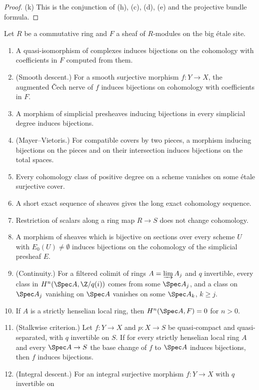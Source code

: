 \begin{proof}
(k) This is the conjunction of (h), (c), (d), (e) and the projective bundle formula.
\end{proof}

\begin{proposition}\label{prop:pf:steps2:etbasic}
Let $R$ be a commutative ring and $F$ a sheaf of $R$-modules on the big \'etale site.
\begin{enumerate}[label=\textup{(\alph*)},leftmargin=2.2em]
\item A quasi-isomorphism of complexes induces bijections on the cohomology with coefficients in
  $F$ computed from them.
\item (Smooth descent.) For a smooth surjective morphism $f\colon Y\to X$, the augmented \v{C}ech nerve
  of $f$ induces bijections on cohomology with coefficients in $F$.
\item A morphism of simplicial presheaves inducing bijections in every simplicial degree induces
  bijections.
\item (Mayer--Vietoris.) For compatible covers by two pieces, a morphism inducing bijections on the
  pieces and on their intersection induces bijections on the total spaces.
\item Every cohomology class of positive degree on a scheme vanishes on some \'etale surjective
  cover.
\item A short exact sequence of sheaves gives the long exact cohomology sequence.
\item Restriction of scalars along a ring map $R\to S$ does not change cohomology.
\item A morphism of sheaves which is bijective on sections over every scheme $U$ with
  $E_0(U)\ne\emptyset$ induces bijections on the cohomology of the simplicial presheaf $E$.
\item (Continuity.) For a filtered colimit of rings $A=\varinjlim A_j$ and $q$ invertible, every class
  in $H^n(\Spec A,\Z/q(i))$ comes from some $\Spec A_j$, and a class on $\Spec A_j$ vanishing on
  $\Spec A$ vanishes on some $\Spec A_k$, $k\ge j$.
\item If $A$ is a strictly henselian local ring, then $H^n(\Spec A,F)=0$ for $n>0$.
\item (Stalkwise criterion.) Let $f\colon Y\to X$ and $p\colon X\to S$ be quasi-compact and
  quasi-separated, with $q$ invertible on $S$. If for every strictly henselian local ring $A$ and
  every $\Spec A\to S$ the base change of $f$ to $\Spec A$ induces bijections, then $f$ induces
  bijections.
\item (Integral descent.) For an integral surjective morphism $f\colon Y\to X$ with $q$ invertible on

\end{enumerate}
\end{proposition}
